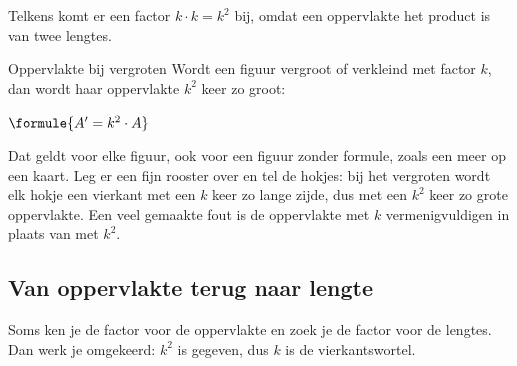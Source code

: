 Telkens komt er een factor $k \cdot k = k^2$ bij, omdat een oppervlakte het product is van twee lengtes.

\begin{theorie}
\begin{stelling}{Oppervlakte bij vergroten}
Wordt een figuur vergroot of verkleind met factor $k$, dan wordt haar oppervlakte $k^2$ keer zo groot:

\vspace{1mm}
\qquad $\formule{A' = k^2 \cdot A}$
\end{stelling}
\end{theorie}

Dat geldt voor elke figuur, ook voor een figuur zonder formule, zoals een meer op een kaart. Leg er een fijn rooster over en tel de hokjes: bij het vergroten wordt elk hokje een vierkant met een $k$ keer zo lange zijde, dus met een $k^2$ keer zo grote oppervlakte. Een veel gemaakte fout is de oppervlakte met $k$ vermenigvuldigen in plaats van met $k^2$.



\subsection{Van oppervlakte terug naar lengte}

Soms ken je de factor voor de oppervlakte en zoek je de factor voor de lengtes. Dan werk je omgekeerd: $k^2$ is gegeven, dus $k$ is de vierkantswortel.

